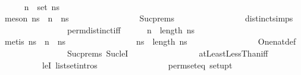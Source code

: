 \documentclass{beamer}
\begin{document}
\begin{frame}{\insertsubsectionhead\
    \textemdash\ \insertsubsubsectionhead}
  \begin{tcolorbox}
    \begin{isabellebody}
      \ \ \ \ \isamarkupfalse%
      \ {\isachardoublequoteopen}n\ {\isasymnotin}\ set\
      ns{\isacharprime}{\isachardoublequoteclose}\isanewline \ \ \ \ \
      \ \isamarkupfalse%
      \ {\isacharparenleft}meson\ {\isacartoucheopen}ns\
      {\isasymsimeq}\ n\ {\isacharhash}\
      ns{\isacharprime}{\isacartoucheclose}\ \isanewline \ \ \ \ \ \ \
      \ \ \ \ \ \ \ \ \
      Suc{\isachardot}prems{\isacharparenleft}{}{\isacharparenright}\
      \isanewline \ \ \ \ \ \ \ \ \ \ \ \ \ \ \ \
      distinct{\isachardot}simps{\isacharparenleft}{}{\isacharparenright}\
      \isanewline \ \ \ \ \ \ \ \ \ \ \ \ \ \ \ \
      perm{\isacharunderscore}distinct{\isacharunderscore}iff{\isacharparenright}\isanewline
      \ \ \ \ \isacommand{hence}\isamarkupfalse%
      \ {\isachardoublequoteopen}n\ {\isasymge}\ length\
      ns{\isachardoublequoteclose}\isanewline \ \ \ \ \ \
      \isamarkupfalse%
      \ {\isacharparenleft}metis\ {\isacartoucheopen}ns\
      {\isasymsimeq}\ n\ {\isacharhash}\
      ns{\isacharprime}{\isacartoucheclose}\ \isanewline \ \ \ \ \ \ \
      \ \ \ \ \ \ \ \ \ {\isacartoucheopen}ns{\isacharprime}\
      {\isasymsimeq}\
      {\isacharbrackleft}{}{\isachardot}{\isachardot}{\isacharless}length\
      ns{\isacharbrackright}{\isacartoucheclose}\ \isanewline \ \ \ \
      \ \ \ \ \ \ \ \ \ \ \ \
      One{\isacharunderscore}nat{\isacharunderscore}def\ \isanewline \
      \ \ \ \ \ \ \ \ \ \ \ \ \ \ \
      Suc{\isachardot}prems{\isacharparenleft}{}{\isacharparenright}\
      Suc{\isacharunderscore}leI\ \isanewline \ \ \ \ \ \ \ \ \ \ \ \
      \ \ \ \ atLeastLessThan{\isacharunderscore}iff\ \isanewline \ \
      \ \ \ \ \ \ \ \ \ \ \ \ \ \ leI\
      list{\isachardot}set{\isacharunderscore}intros{\isacharparenleft}{}{\isacharparenright}\
      \isanewline \ \ \ \ \ \ \ \ \ \ \ \ \ \ \ \
      perm{\isacharunderscore}set{\isacharunderscore}eq\
      set{\isacharunderscore}upt{\isacharparenright}
    \end{isabellebody}
  \end{tcolorbox}

  \framebreak


\end{frame}
\end{document}
